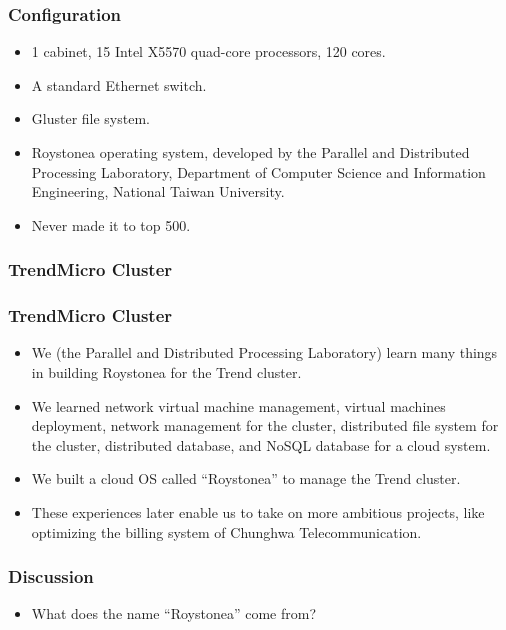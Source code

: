 \documentclass{beamer}
\begin{document}
\begin{CJK}{UTF8}{bsmi}
\begin{frame}
\frametitle{Configuration}
\begin{itemize}
\item 1 cabinet, 15 Intel X5570 quad-core processors, 120 cores.
\item A standard Ethernet switch.
\item Gluster file system.
\item Roystonea operating system, developed by the Parallel and Distributed Processing Laboratory, Department of Computer Science and Information Engineering, National Taiwan University.
\item Never made it to top 500.
\end{itemize}
\end{frame}

\begin{frame}
\frametitle{TrendMicro Cluster}
\centerline{}
\end{frame}

\begin{frame}
\frametitle{TrendMicro Cluster}
\centerline{}
\end{frame}

\begin{frame}
\begin{itemize}
\item We (the Parallel and Distributed Processing Laboratory) learn
  many things in building Roystonea for the Trend cluster.
\item We learned network virtual machine management, virtual machines deployment, network management for the cluster, distributed file system for the cluster, distributed database, and NoSQL database for a cloud system.
\item We built a cloud OS called ``Roystonea'' to manage the Trend cluster.
\item These experiences later enable us to take on more ambitious projects, like optimizing the billing system of Chunghwa Telecommunication.
\end{itemize}
\end{frame}


\begin{frame}
\frametitle{Discussion}
\begin{itemize}
\item What does the name ``Roystonea'' come from?
\end{itemize}
\end{frame}


\end{CJK}
\end{document}
